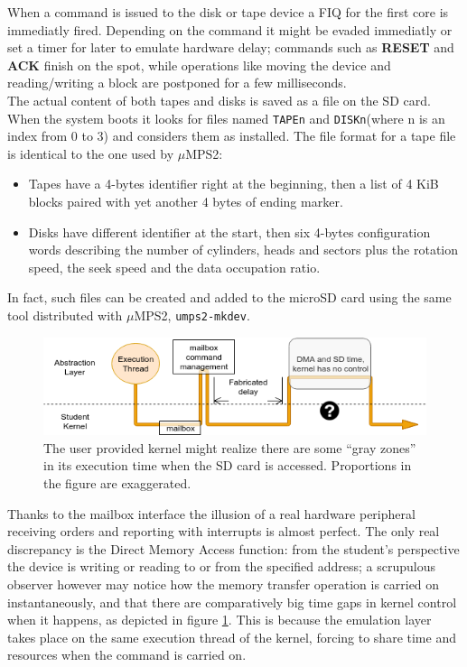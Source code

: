 \documentclass[12pt,a4paper,openright,twoside]{report}
\begin{document}
When a command is issued to the disk or tape device a FIQ for the first core is immediatly
fired. Depending on the command it might be evaded immediatly or set a timer for
later to emulate hardware delay; commands such as \textbf{RESET} and \textbf{ACK}
finish on the spot, while operations like moving the device and reading/writing
 a block are postponed for a few milliseconds.\\

The actual content of both tapes and disks is saved as a file on the SD card. When the system 
boots it looks for files named {\tt TAPEn} and {\tt DISKn}(where n is an index from 0 to 
3) and considers them as installed. 
The file format for a tape file is identical to the one used by $\mu$MPS2: 
\begin{itemize}
    \item Tapes have a 4-bytes identifier right at the beginning, then 
        a list of 4 KiB blocks paired with yet another 4 bytes of ending marker.
    \item Disks have different identifier at the start, then six 4-bytes configuration
        words describing the number of cylinders, heads and sectors plus the rotation
        speed, the seek speed and the data occupation ratio.
\end{itemize}
In fact, such files can be created and added to the microSD card using the same tool
distributed with $\mu$MPS2, {\tt umps2-mkdev}.

 \begin{figure}[t]
    \begin{center}
 \includegraphics[scale=0.65]{images/tesi13.png}
 \caption[Execution thread]{The user provided kernel might realize there are some
 ``gray zones'' in its execution time when the SD card is accessed. Proportions
 in the figure are exaggerated.}
 \label{fig:executionthread}
    \end{center}
 \end{figure}

Thanks to the mailbox interface the illusion of a real hardware peripheral receiving
orders and reporting with interrupts is almost perfect. The only real discrepancy
is the Direct Memory Access function: from the student's perspective the device
is writing or reading to or from the specified address; a scrupulous observer
however may notice how the memory transfer operation is carried on instantaneously,
and that there are comparatively big time gaps in kernel control when it happens,
as depicted in figure \ref{fig:executionthread}.
This is because the emulation layer takes place on the same execution thread of
the kernel, forcing to share time and resources when the command is carried on.
\end{document}
